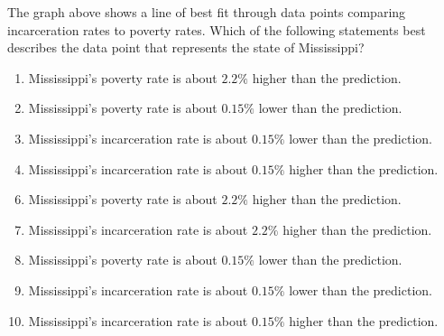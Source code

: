  
\begin{center}\end{center}\vspace{-2mm}
The graph above shows a line of best fit through data points comparing incarceration rates to poverty rates.  Which of the following statements best describes the data point that represents the state of Mississippi?


\ifsat
	\begin{enumerate}[label=\Alph*)]
		\item Mississippi's poverty rate is about $2.2\%$ higher than the prediction.
		\item Mississippi's poverty rate is about $0.15\%$ lower than the prediction.
		\item Mississippi's incarceration rate is about $0.15\%$ lower than the prediction. %
		\item Mississippi's incarceration rate is about $0.15\%$ higher than the prediction.
	\end{enumerate}
\else
\fi

\ifacteven
	\begin{enumerate}[label=\textbf{\Alph*.},itemsep=\fill,align=left]
		\setcounter{enumii}{5}
		\item Mississippi's poverty rate is about $2.2\%$ higher than the prediction.
		\item Mississippi's incarceration rate is about $2.2\%$ higher than the prediction.
		\item Mississippi's poverty rate is about $0.15\%$ lower than the prediction.
		\addtocounter{enumii}{1}
		\item Mississippi's incarceration rate is about $0.15\%$ lower than the prediction. %
		\item Mississippi's incarceration rate is about $0.15\%$ higher than the prediction.
	\end{enumerate}
\else
\fi

